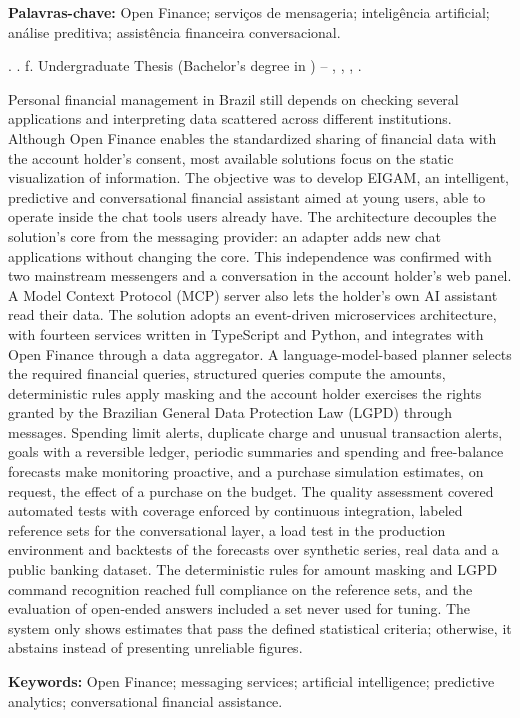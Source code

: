 \textbf{Palavras-chave:} Open Finance; serviços de mensageria; inteligência artificial; análise preditiva; assistência financeira conversacional.
\endgroup

\newpage
{}

\begingroup
{}
\setlength{\parindent}{0pt}

\authorsCitation{} \textbf{\workTitleEnglish}\ifdefempty{\workSubtitleEnglish}{}{: \workSubtitleEnglish}. \workYear. \pageref{LastPage} f. Undergraduate Thesis (Bachelor's degree in \courseNameEnglish) -- \centerNameEnglish, \universityNameEnglish, \workCity, \workYear.\par
\vspace{\baselineskip}

Personal financial management in Brazil still depends on checking several applications and interpreting data scattered across different institutions. Although Open Finance enables the standardized sharing of financial data with the account holder's consent, most available solutions focus on the static visualization of information. The objective was to develop EIGAM, an intelligent, predictive and conversational financial assistant aimed at young users, able to operate inside the chat tools users already have. The architecture decouples the solution's core from the messaging provider: an adapter adds new chat applications without changing the core. This independence was confirmed with two mainstream messengers and a conversation in the account holder's web panel. A Model Context Protocol (MCP) server also lets the holder's own AI assistant read their data. The solution adopts an event-driven microservices architecture, with fourteen services written in TypeScript and Python, and integrates with Open Finance through a data aggregator. A language-model-based planner selects the required financial queries, structured queries compute the amounts, deterministic rules apply masking and the account holder exercises the rights granted by the Brazilian General Data Protection Law (LGPD) through messages. Spending limit alerts, duplicate charge and unusual transaction alerts, goals with a reversible ledger, periodic summaries and spending and free-balance forecasts make monitoring proactive, and a purchase simulation estimates, on request, the effect of a purchase on the budget. The quality assessment covered automated tests with coverage enforced by continuous integration, labeled reference sets for the conversational layer, a load test in the production environment and backtests of the forecasts over synthetic series, real data and a public banking dataset. The deterministic rules for amount masking and LGPD command recognition reached full compliance on the reference sets, and the evaluation of open-ended answers included a set never used for tuning. The system only shows estimates that pass the defined statistical criteria; otherwise, it abstains instead of presenting unreliable figures.\par
\vspace{\baselineskip}

\textbf{Keywords:} Open Finance; messaging services; artificial intelligence; predictive analytics; conversational financial assistance.
\endgroup

